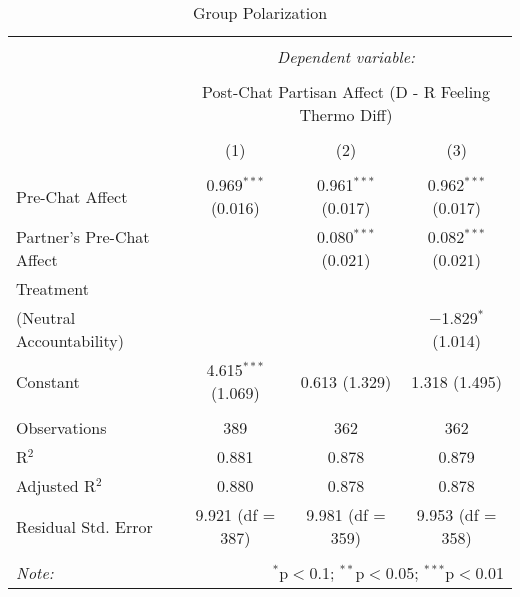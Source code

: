 
\begin{table}[H] \centering 
  \caption{Group Polarization} 
  \label{tab:s2_group_polarization_main} 
\begin{tabular}{@{\extracolsep{5pt}}lccc} 
\\[-1.8ex]\hline 
\hline \\[-1.8ex] 
 & \multicolumn{3}{c}{\textit{Dependent variable:}} \\ 
\cline{2-4} 
\\[-1.8ex] & \multicolumn{3}{c}{Post-Chat Partisan Affect (D - R Feeling Thermo Diff)} \\ 
\\[-1.8ex] & (1) & (2) & (3)\\ 
\hline \\[-1.8ex] 
 Pre-Chat Affect & 0.969$^{***}$ (0.016) & 0.961$^{***}$ (0.017) & 0.962$^{***}$ (0.017) \\ 
  Partner's Pre-Chat Affect &  & 0.080$^{***}$ (0.021) & 0.082$^{***}$ (0.021) \\ 
  Treatment\\(Neutral Accountability) &  &  & $-$1.829$^{*}$ (1.014) \\ 
  Constant & 4.615$^{***}$ (1.069) & 0.613 (1.329) & 1.318 (1.495) \\ 
 \hline \\[-1.8ex] 
Observations & 389 & 362 & 362 \\ 
R$^{2}$ & 0.881 & 0.878 & 0.879 \\ 
Adjusted R$^{2}$ & 0.880 & 0.878 & 0.878 \\ 
Residual Std. Error & 9.921 (df = 387) & 9.981 (df = 359) & 9.953 (df = 358) \\ 
\hline 
\hline \\[-1.8ex] 
\textit{Note:}  & \multicolumn{3}{r}{$^{*}$p$<$0.1; $^{**}$p$<$0.05; $^{***}$p$<$0.01} \\ 
\end{tabular} 
\end{table} 
